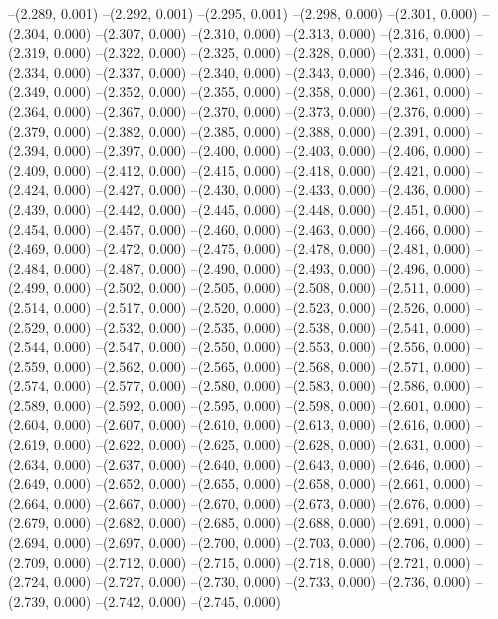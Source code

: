 {--(2.289, 0.001)
--(2.292, 0.001)
--(2.295, 0.001)
--(2.298, 0.000)
--(2.301, 0.000)
--(2.304, 0.000)
--(2.307, 0.000)
--(2.310, 0.000)
--(2.313, 0.000)
--(2.316, 0.000)
--(2.319, 0.000)
--(2.322, 0.000)
--(2.325, 0.000)
--(2.328, 0.000)
--(2.331, 0.000)
--(2.334, 0.000)
--(2.337, 0.000)
--(2.340, 0.000)
--(2.343, 0.000)
--(2.346, 0.000)
--(2.349, 0.000)
--(2.352, 0.000)
--(2.355, 0.000)
--(2.358, 0.000)
--(2.361, 0.000)
--(2.364, 0.000)
--(2.367, 0.000)
--(2.370, 0.000)
--(2.373, 0.000)
--(2.376, 0.000)
--(2.379, 0.000)
--(2.382, 0.000)
--(2.385, 0.000)
--(2.388, 0.000)
--(2.391, 0.000)
--(2.394, 0.000)
--(2.397, 0.000)
--(2.400, 0.000)
--(2.403, 0.000)
--(2.406, 0.000)
--(2.409, 0.000)
--(2.412, 0.000)
--(2.415, 0.000)
--(2.418, 0.000)
--(2.421, 0.000)
--(2.424, 0.000)
--(2.427, 0.000)
--(2.430, 0.000)
--(2.433, 0.000)
--(2.436, 0.000)
--(2.439, 0.000)
--(2.442, 0.000)
--(2.445, 0.000)
--(2.448, 0.000)
--(2.451, 0.000)
--(2.454, 0.000)
--(2.457, 0.000)
--(2.460, 0.000)
--(2.463, 0.000)
--(2.466, 0.000)
--(2.469, 0.000)
--(2.472, 0.000)
--(2.475, 0.000)
--(2.478, 0.000)
--(2.481, 0.000)
--(2.484, 0.000)
--(2.487, 0.000)
--(2.490, 0.000)
--(2.493, 0.000)
--(2.496, 0.000)
--(2.499, 0.000)
--(2.502, 0.000)
--(2.505, 0.000)
--(2.508, 0.000)
--(2.511, 0.000)
--(2.514, 0.000)
--(2.517, 0.000)
--(2.520, 0.000)
--(2.523, 0.000)
--(2.526, 0.000)
--(2.529, 0.000)
--(2.532, 0.000)
--(2.535, 0.000)
--(2.538, 0.000)
--(2.541, 0.000)
--(2.544, 0.000)
--(2.547, 0.000)
--(2.550, 0.000)
--(2.553, 0.000)
--(2.556, 0.000)
--(2.559, 0.000)
--(2.562, 0.000)
--(2.565, 0.000)
--(2.568, 0.000)
--(2.571, 0.000)
--(2.574, 0.000)
--(2.577, 0.000)
--(2.580, 0.000)
--(2.583, 0.000)
--(2.586, 0.000)
--(2.589, 0.000)
--(2.592, 0.000)
--(2.595, 0.000)
--(2.598, 0.000)
--(2.601, 0.000)
--(2.604, 0.000)
--(2.607, 0.000)
--(2.610, 0.000)
--(2.613, 0.000)
--(2.616, 0.000)
--(2.619, 0.000)
--(2.622, 0.000)
--(2.625, 0.000)
--(2.628, 0.000)
--(2.631, 0.000)
--(2.634, 0.000)
--(2.637, 0.000)
--(2.640, 0.000)
--(2.643, 0.000)
--(2.646, 0.000)
--(2.649, 0.000)
--(2.652, 0.000)
--(2.655, 0.000)
--(2.658, 0.000)
--(2.661, 0.000)
--(2.664, 0.000)
--(2.667, 0.000)
--(2.670, 0.000)
--(2.673, 0.000)
--(2.676, 0.000)
--(2.679, 0.000)
--(2.682, 0.000)
--(2.685, 0.000)
--(2.688, 0.000)
--(2.691, 0.000)
--(2.694, 0.000)
--(2.697, 0.000)
--(2.700, 0.000)
--(2.703, 0.000)
--(2.706, 0.000)
--(2.709, 0.000)
--(2.712, 0.000)
--(2.715, 0.000)
--(2.718, 0.000)
--(2.721, 0.000)
--(2.724, 0.000)
--(2.727, 0.000)
--(2.730, 0.000)
--(2.733, 0.000)
--(2.736, 0.000)
--(2.739, 0.000)
--(2.742, 0.000)
--(2.745, 0.000)
}
